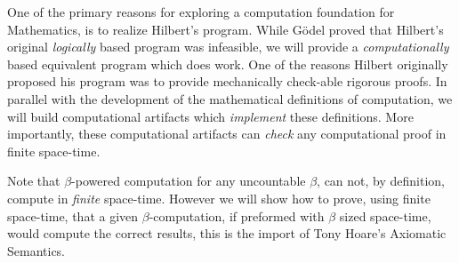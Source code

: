 One of the primary reasons for exploring a computation foundation for
Mathematics, is to realize Hilbert's program. While G\"odel proved that
Hilbert's original \emph{logically} based program was infeasible, we will
provide a \emph{computationally} based equivalent program which does work. One
of the reasons Hilbert originally proposed his program was to provide
mechanically check-able rigorous proofs. In parallel with the development of the
mathematical definitions of computation, we will build computational artifacts
which \emph{implement} these definitions. More importantly, these computational
artifacts can \emph{check} any computational proof in finite space-time.

Note that $\beta$-powered computation for any uncountable $\beta$, can not, by
definition, compute in \emph{finite} space-time. However we will show how to
prove, using finite space-time, that a given $\beta$-computation, if preformed
with $\beta$ sized space-time, would compute the correct results, this is the
import of Tony Hoare's Axiomatic Semantics.

